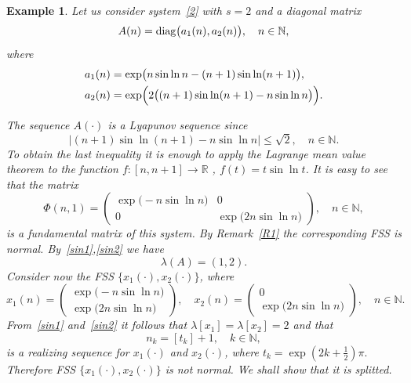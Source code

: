 \documentclass[11pt]{article}
\newtheorem{example}[theorem]{Example}
\begin{document}
\begin{example}
\label{ex2} 
\textrm{Let us consider system~\eqref{2} with $s=2$ and a
diagonal matrix 
\begin{equation*}
A(n)=\mathop{\rm diag}\bigl(a_1(n),a_2(n)\bigr),\quad n\in\mathbb{N},
\end{equation*}
where 
\begin{align*}
a_1(n) & =  \exp\bigl(n\sin\ln n-(n+1)\sin\ln(n+1)\bigr), \\
a_2(n) & =  \exp\Bigl(2\bigl((n+1)\sin\ln(n+1)-n\sin\ln n\bigr)\Bigr).
\end{align*}
}

\textrm{The sequence $A(\cdot )$ is a Lyapunov sequence since%
\begin{equation*}
\bigl|(n+1)\sin \ln (n+1)-n\sin \ln n\bigr|\le \sqrt{2},\quad n\in \mathbb{N%
}.
\end{equation*}%
To obtain the last inequality it is enough to apply the Lagrange mean value
theorem to the function $f\colon [ n,n+1] \to \mathbb{R}$%
, $f(t)=t\sin \ln t$. It is easy to see that the matrix%
\begin{equation*}
\Phi(n,1)=\left( 
\begin{array}{cc}
\exp \bigl(-n\sin \ln n\bigr) & 0 \\ 
0 & \exp \bigl(2n\sin \ln n\bigr)%
\end{array}%
\right) ,\quad n\in \mathbb{N},
\end{equation*}%
is a fundamental matrix of this system. By Remark~\ref{R1} the corresponding
FSS is normal. By~\eqref{sin1},\thinspace \eqref{sin2} we have%
\begin{equation*}
\lambda (A)=(1,2).
\end{equation*}%
Consider now the FSS $\bigl\{x_{1}(\cdot ),x_{2}(\cdot )\bigr\}$, where 
\begin{equation*}
x_{1}(n)=\left( 
\begin{array}{c}
\exp \bigl(-n\sin \ln n\bigr) \\ 
\exp \bigl(2n\sin \ln n\bigr)%
\end{array}%
\right) ,
\quad
x_{2}( n) =\left( 
\begin{array}{c}
0 \\ 
\exp \bigl(2n\sin \ln n\bigr)%
\end{array}%
\right) ,\quad n\in \mathbb{N}.
\end{equation*}%
From~\eqref{sin1} and~\eqref{sin2} it follows that $\lambda [ x_{1}%
] =\lambda [ x_{2}] =2$ and that 
\begin{equation*}
n_{k}=[ t_{k}] +1,\quad k\in \mathbb{N},
\end{equation*}%
is a realizing sequence for $x_{1}(\cdot )$ and $x_{2}(\cdot )$, where $%
t_{k}=\exp \left( 2k+\frac{1}{2}\right) \pi .$ Therefore FSS $\bigl\{%
x_{1}(\cdot ),x_{2}(\cdot )\bigr\}$ is not normal. We shall show that it is
splitted. }


\end{example}
\end{document}
